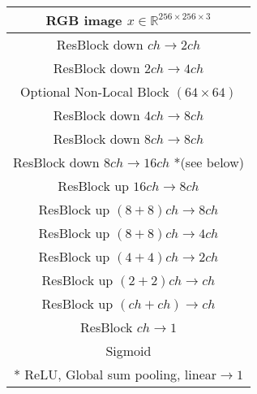 \documentclass[10pt,twocolumn,letterpaper]{article}
\begin{document}
\begin{table*}\vspace{0em}
	\setlength{\tabcolsep}{0.25em}
	\renewcommand{\arraystretch}{1.5}
	\centering



	\begin{minipage}[t]{.45\textwidth}
			\centering
	\begin{tabular}{c}
	
	\hline 	\hline
    RGB image $x \in \mathbb{R}^{256 \times 256 \times 3}$ \\
	\hline
	ResBlock down $ch \rightarrow  2ch$ \\
	\hline
	ResBlock down $2ch \rightarrow  4ch$ \\
	\hline
	Optional Non-Local Block $(64 \times 64)$ \\
	\hline
	ResBlock down $4ch \rightarrow  8ch$ \\
	\hline
	ResBlock down $8ch \rightarrow  8ch$ \\
	\hline
	ResBlock down $8ch \rightarrow  16ch$ *(see below) \\
	\hline
	\hline
	ResBlock up $16ch \rightarrow  8ch$ \\
	\hline
	ResBlock up $(8+8)ch \rightarrow  8ch$ \\
	\hline
	ResBlock up $(8+8)ch \rightarrow  4ch$ \\
	\hline
	ResBlock up $(4+4)ch \rightarrow  2ch$ \\
	\hline
	ResBlock up $(2+2)ch \rightarrow  ch$ \\
	\hline
	ResBlock up $(ch + ch) \rightarrow  ch$ \\
	\hline
	ResBlock $ch \rightarrow 1 $ \\
	\hline
	Sigmoid \\
	\hline 	\hline 
	* ReLU, Global sum pooling, linear$\rightarrow 1$	 \\
 \hline 	\hline
   \end{tabular}

\end{minipage} \hspace{0.5cm}
	\begin{minipage}[t]{.45\textwidth}	
			\centering
\begin{tabular}{c}


\end{tabular}
\end{minipage}
\end{table*}
\end{document}
